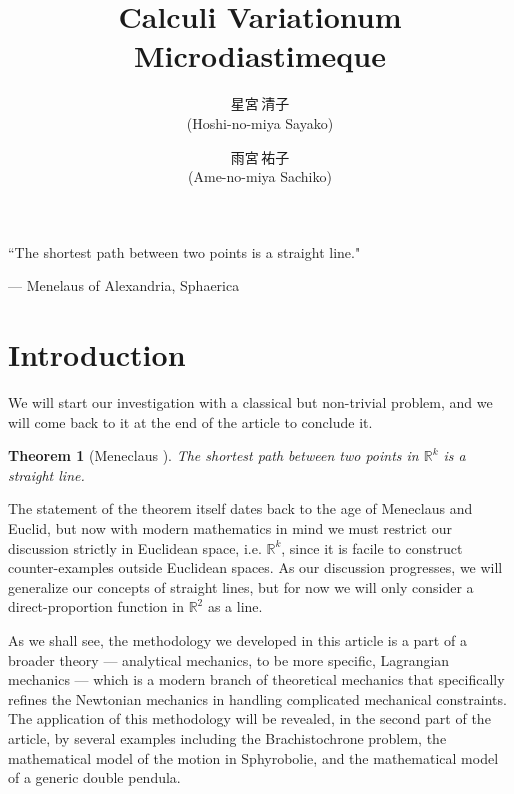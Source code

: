 \documentclass[12pt,a4paper]{article}
\author{$\text{星宮}\,\text{清子}$\\(Hoshi-no-miya Sayako)\and$\text{雨宮}\,\text{祐子}$\\(Ame-no-miya Sachiko)}
\date{}
\title{Calculi Variationum Microdiastimeque}
\newtheorem{theorem}{Theorem}
\begin{document}
\maketitle
\epigraphsize{\small\itshape}
\epigraph{``The shortest path between two points is a straight line."}{--- \textup{Menelaus of Alexandria}, Sphaerica \textup{\cite{meneclaus}}}

\section{Introduction}
We will start our investigation with a classical but non-trivial problem, and we will come back to it at the end of the article to conclude it.

\begin{theorem}[Meneclaus \cite{meneclaus}]
\label{thm:microdiastime}
The shortest path between two points in $\mathbb{R}^k$ is a straight line.
\end{theorem}

The statement of the theorem itself dates back to the age of Meneclaus and Euclid, but now with modern mathematics in mind we must restrict our discussion strictly in Euclidean space, i.e. $\mathbb{R}^k$, since it is facile to construct counter-examples outside Euclidean spaces. As our discussion progresses, we will generalize our concepts of straight lines, but for now we will only consider a direct-proportion function in $\mathbb{R}^2$ as a line.

As we shall see, the methodology we developed in this article is a part of a broader theory --- analytical mechanics, to be more specific, Lagrangian mechanics --- which is a modern branch of theoretical mechanics that specifically refines the Newtonian mechanics in handling complicated mechanical constraints. The application of this methodology will be revealed, in the second part of the article, by several examples including the Brachistochrone problem, the mathematical model of the motion in Sphyrobolie, and the mathematical model of a generic double pendula.
\end{document}
